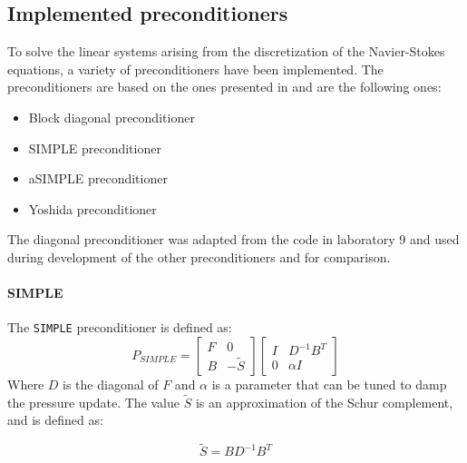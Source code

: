 \subsection{Implemented preconditioners}
To solve the linear systems arising from the discretization of the Navier-Stokes equations, a variety of preconditioners have been implemented. The preconditioners are based on the ones presented in \cite{Quarteroni} and are the following ones:
\begin{itemize}
    \item Block diagonal preconditioner
    \item SIMPLE preconditioner
    \item aSIMPLE preconditioner
    \item Yoshida preconditioner
\end{itemize}
The diagonal preconditioner was adapted from the code in laboratory 9 and used during development of the other preconditioners and for comparison. 

\paragraph{SIMPLE}
The \texttt{SIMPLE} preconditioner is defined as:
\begin{equation}
    P_{SIMPLE} = \begin{bmatrix}
        F & 0 \\
        B & -\tilde{S} 
    \end{bmatrix}
    \begin{bmatrix}
        I & D^{-1}B^T \\
        0 & \alpha I
    \end{bmatrix}
\end{equation}
Where $D$ is the diagonal of $F$ and $\alpha$ is a parameter that can be tuned to damp the pressure update. The value $\tilde S$ is an approximation of the Schur complement, and is defined as:

\begin{equation}
    \tilde{S} = B D^{-1} B^T
\end{equation}


